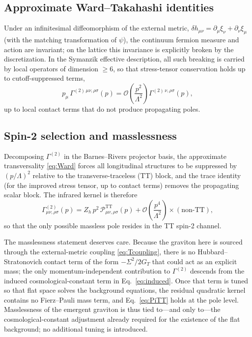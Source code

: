 \documentclass[11pt,a4paper]{article}
\begin{document}
\subsection{Approximate Ward--Takahashi identities}

Under an infinitesimal diffeomorphism of the external metric,
$\delta h_{\mu\nu} = \partial_\mu\xi_\nu + \partial_\nu\xi_\mu$
(with the matching transformation of $\psi$), the continuum
fermion measure and action are invariant; on the lattice this
invariance is explicitly broken by the discretization.
In the Symanzik effective description, all such breaking is carried
by local operators of dimension $\geq 6$, so that stress-tensor
conservation holds up to cutoff-suppressed terms,
\begin{equation}
p_\mu\,\Gamma^{(2)\,\mu\nu,\rho\sigma}(p)
= \mathcal{O}\!\left(\frac{p^2}{\Lambda^2}\right)
\Gamma^{(2)\,\nu,\rho\sigma}(p),
\label{eq:Ward}
\end{equation}
up to local contact terms that do not produce propagating poles.

\subsection{Spin-2 selection and masslessness}

Decomposing $\Gamma^{(2)}$ in the Barnes--Rivers projector basis,
the approximate transversality \eqref{eq:Ward} forces all
longitudinal structures to be suppressed by $(p/\Lambda)^2$
relative to the transverse-traceless (TT) block, and the trace
identity (for the improved stress tensor, up to contact terms)
removes the propagating scalar block.
The infrared kernel is therefore
\begin{equation}
\Gamma^{(2)}_{\mu\nu,\rho\sigma}(p)
= Z_h\,p^2\,
\mathcal{P}^{\mathrm{TT}}_{\mu\nu,\rho\sigma}(p)
+ \mathcal{O}\!\left(\frac{p^4}{\Lambda^2}\right)
\times(\text{non-TT}),
\label{eq:PiTT}
\end{equation}
so that the only possible massless pole resides in the TT spin-2
channel.

The masslessness statement deserves care.
Because the graviton here is sourced through the external-metric
coupling \eqref{eq:Tcoupling}, there is no Hubbard--Stratonovich
contact term of the form $-\Sigma^2/2G_T$ that could act as an
explicit mass; the only momentum-independent contribution to
$\Gamma^{(2)}$ descends from the induced cosmological-constant term
in Eq.~\eqref{eq:induced}.
Once that term is tuned so that flat space solves the background
equations, the residual quadratic kernel contains no Fierz--Pauli
mass term, and Eq.~\eqref{eq:PiTT} holds at the pole level.
Masslessness of the emergent graviton is thus tied to---and only
to---the cosmological-constant adjustment already required for the
existence of the flat background; no additional tuning is
introduced.
\end{document}

